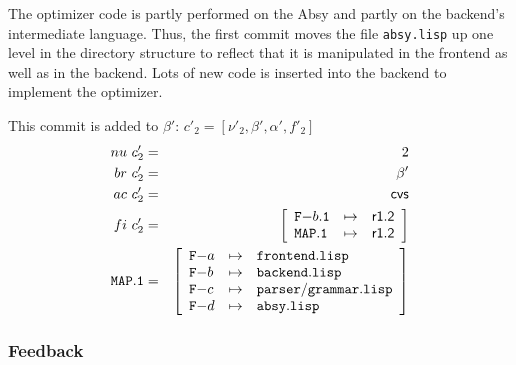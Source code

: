 \documentclass[fleqn, 10pt, a4paper]{article}
\begin{document}
The optimizer code is partly performed on the Absy and partly
on the backend's intermediate language. Thus, the first commit
moves the file \texttt{absy.lisp} up one level in the directory
structure to reflect that it is manipulated in the frontend
as well as in the backend. Lots of new code is inserted into
the backend to implement the optimizer.

This commit is added to $\beta'$: $c'_2=[\nu'_2, \beta', \alpha', f'_2]$
\begin{eqnarray*}
\mathnormal{nu}\ c'_2 &=& 2 \\
\mathnormal{br}\ c'_2 &=& \beta' \\
\mathnormal{ac}\ c'_2 &=& \mathsf{cvs} \\
\mathnormal{fi}\ c'_2 &=& \left[
\begin{array}{lcl}
\mathtt{F-}b\mathtt{.1} & \mapsto & \mathsf{r1.2} \\
\mathtt{MAP.1}         & \mapsto & \mathsf{r1.2} \\
\end{array}\right] \\
\mathtt{MAP.1} &=& \left[
\begin{array}{lcl}
\mathtt{F-}a &\mapsto& \mathtt{frontend.lisp} \\
\mathtt{F-}b &\mapsto& \mathtt{backend.lisp} \\
\mathtt{F-}c &\mapsto& \mathtt{parser/grammar.lisp} \\
\mathtt{F-}d &\mapsto& \mathtt{absy.lisp} \\
\end{array}\right]
\end{eqnarray*}

\subsubsection{Feedback}
\end{document}
